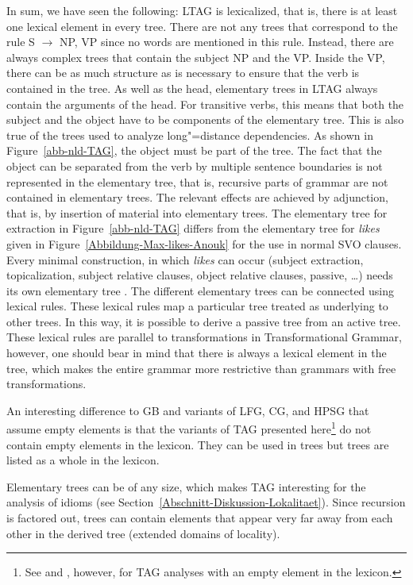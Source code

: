 In sum, we have seen the following: LTAG is lexicalized, that is, there is at least one lexical element in every tree.
There are not any trees that correspond to the rule S $\to$ NP, VP since no words are mentioned in this rule.
Instead, there are always complex trees that contain the subject NP and the VP. Inside the VP, there can be as much structure
as is necessary to ensure that the verb is contained in the tree. As well as the head, elementary trees in LTAG always contain
the arguments of the head. For transitive verbs, this means that both the subject and the object have to be components of the
elementary tree. This is also true of the trees used to analyze long"=distance dependencies. As shown in Figure~\ref{abb-nld-TAG},
the object must be part of the tree. The fact that the object can be separated from the verb by multiple sentence boundaries is not
represented in the elementary tree, that is, recursive parts of grammar are not contained in elementary trees.
The relevant effects are achieved by adjunction, that is, by insertion of material into elementary trees.
The elementary tree for extraction in Figure~\ref{abb-nld-TAG} differs from the elementary tree for \emph{likes} given in
Figure~\ref{Abbildung-Max-likes-Anouk} for the use in normal SVO clauses. Every minimal construction, in which \emph{likes}
can occur (subject extraction, topicalization, subject relative clauses, object relative clauses, passive, \ldots) needs its own
elementary tree \citep[]{KJ2003a}. The different elementary trees can be connected using lexical rules.
These lexical rules map a particular tree treated as underlying to other trees. In this way, it is possible to derive
a passive tree from an active tree. These lexical rules are parallel to transformations in Transformational
Grammar, however, one should bear in mind that there is always a lexical element in the tree, which makes the entire grammar
more restrictive than grammars with free transformations.

An interesting difference to GB and variants of LFG, CG, and HPSG that assume empty elements is that
the variants of TAG presented here\footnote{
	See  and , however, for TAG analyses with an empty element in the lexicon.%
} do not contain empty elements in the lexicon. They can be used in trees but trees are listed as a whole in the lexicon.

Elementary trees can be of any size, which makes TAG interesting for the analysis of idioms (see Section~\ref{Abschnitt-Diskussion-Lokalitaet}). 
Since recursion is factored out, trees can contain elements that appear very far away from each other in
the derived tree (extended domains of locality).

